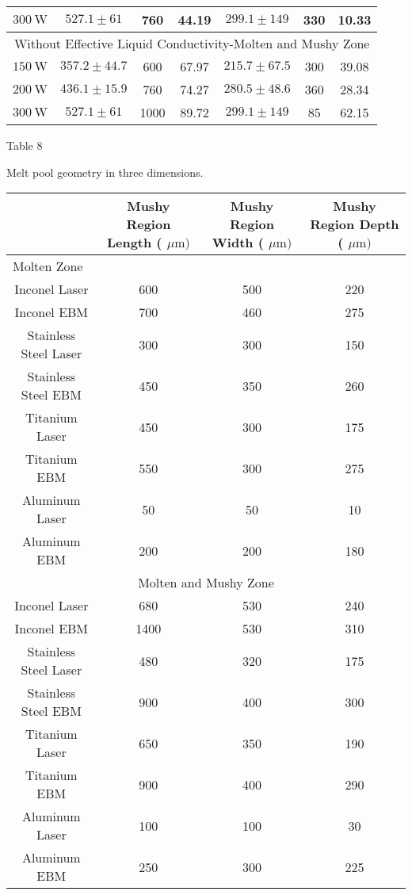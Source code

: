\documentclass[10pt]{article}
\begin{document}
\begin{center}
\begin{tabular}{|c|c|c|c|c|c|c|}
\hline
$300 \mathrm{~W}$ & $527.1 \pm 61$ & 760 & 44.19 & $299.1 \pm 149$ & 330 & 10.33 \\
\hline
\multicolumn{7}{|c|}{Without Effective Liquid Conductivity-Molten and Mushy Zone} \\
\hline
$150 \mathrm{~W}$ & $357.2 \pm 44.7$ & 600 & 67.97 & $215.7 \pm 67.5$ & 300 & 39.08 \\
\hline
$200 \mathrm{~W}$ & $436.1 \pm 15.9$ & 760 & 74.27 & $280.5 \pm 48.6$ & 360 & 28.34 \\
\hline
$300 \mathrm{~W}$ & $527.1 \pm 61$ & 1000 & 89.72 & $299.1 \pm 149$ & 85 & 62.15 \\
\hline
\end{tabular}
\end{center}

Table 8

Melt pool geometry in three dimensions.

\begin{center}
\begin{tabular}{|c|c|c|c|}
\hline
 & Mushy Region Length ( $\mu \mathrm{m})$ & Mushy Region Width ( $\mu \mathrm{m})$ & Mushy Region Depth ( $\mu \mathrm{m})$ \\
\hline
\multicolumn{4}{|l|}{Molten Zone} \\
\hline
Inconel Laser & 600 & 500 & 220 \\
\hline
Inconel EBM & 700 & 460 & 275 \\
\hline
Stainless Steel Laser & 300 & 300 & 150 \\
\hline
Stainless Steel EBM & 450 & 350 & 260 \\
\hline
Titanium Laser & 450 & 300 & 175 \\
\hline
Titanium EBM & 550 & 300 & 275 \\
\hline
Aluminum Laser & 50 & 50 & 10 \\
\hline
Aluminum EBM & 200 & 200 & 180 \\
\hline
\multicolumn{4}{|c|}{Molten and Mushy Zone} \\
\hline
Inconel Laser & 680 & 530 & 240 \\
\hline
Inconel EBM & 1400 & 530 & 310 \\
\hline
Stainless Steel Laser & 480 & 320 & 175 \\
\hline
Stainless Steel EBM & 900 & 400 & 300 \\
\hline
Titanium Laser & 650 & 350 & 190 \\
\hline
Titanium EBM & 900 & 400 & 290 \\
\hline
Aluminum Laser & 100 & 100 & 30 \\
\hline
Aluminum EBM & 250 & 300 & 225 \\
\hline
\end{tabular}
\end{center}
\end{document}
